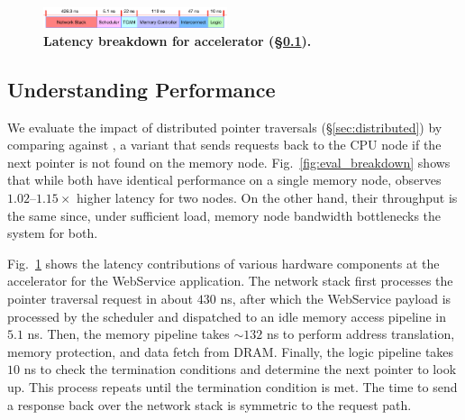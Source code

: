 \begin{figure}[t]
  \centering	
  \includegraphics[width=0.48\textwidth]{fig/pulse/breakdown_latency_new.pdf}
  \vspace{-1em}
  \caption{\textbf{Latency breakdown for \pulse accelerator (\S\ref{ssec:breakdown}).}}
  \label{fig:eval_breakdown_latency_}%
\end{figure}




\subsection{Understanding \pulse Performance}
\label{ssec:breakdown}




 We evaluate the impact of distributed pointer traversals (\S\ref{sec:distributed}) by comparing \pulse against \pulseacc, a \pulse variant that sends requests back to the CPU node if the next pointer is not found on the memory node. Fig.~\ref{fig:eval_breakdown} shows that while both have identical performance on a single memory node, \pulseacc observes $1.02$--$1.15\times$ higher latency for two nodes. On the other hand, their throughput is the same since, under sufficient load, memory node bandwidth bottlenecks the system for both.





Fig.~\ref{fig:eval_breakdown_latency_} shows the latency contributions of various hardware components at the \pulse accelerator for the WebService application. The network stack first processes the pointer traversal request in about $430$ ns, after which the WebService payload is processed by the scheduler and dispatched to an idle memory access pipeline in $5.1$ ns. Then, the memory pipeline takes $\sim$$132$ ns to perform address translation, memory protection, and data fetch from DRAM. Finally, the logic pipeline takes $10$ ns to check the termination conditions and determine the next pointer to look up. This process repeats until the termination condition is met. The time to send a response back over the network stack is symmetric to the request path.












